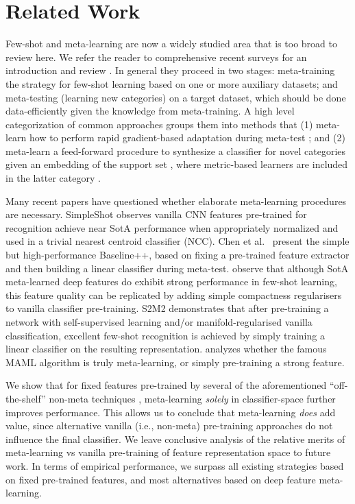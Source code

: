 \documentclass[10pt,twocolumn,letterpaper]{article}
\begin{document}
\section{Related Work}
Few-shot and meta-learning are now a widely studied area that is too broad to review here. We refer the reader to comprehensive recent surveys for an introduction and review \cite{wang2019fewShotSurvey,hospedales2020metaSurvey}. In general they proceed in two stages: meta-training the strategy for few-shot learning based on one or more auxiliary datasets; and meta-testing (learning new categories) on a target dataset, which should be done data-efficiently given the knowledge from meta-training.
A high level categorization of common approaches groups them into methods that (1) meta-learn how to perform rapid gradient-based adaptation during meta-test \cite{finn2017model,zintgraf2018cavia}; and (2) meta-learn a feed-forward procedure to synthesize a classifier for novel categories given an embedding of the support set \cite{gordon2019metaPred,qiao2017few}, where metric-based learners are included in the latter category \cite{hospedales2020metaSurvey}. 

 Many recent papers have questioned whether elaborate meta-learning procedures are necessary. 
SimpleShot \cite{wang2019simpleshot} observes vanilla CNN features pre-trained for recognition achieve near SotA performance when appropriately normalized and used in a trivial nearest centroid classifier (NCC). Chen et al.~\cite{chen2019closerfewshot} present the simple but high-performance Baseline++, based on fixing a pre-trained feature extractor and then building a linear classifier during meta-test.
\cite{goldblum2020unraveling} observe that although SotA meta-learned deep features do exhibit strong performance in few-shot learning, this feature quality can be replicated by adding simple compactness regularisers to vanilla classifier pre-training. S2M2 \cite{mangla2020charting} demonstrates that after pre-training a network with self-supervised learning and/or manifold-regularised vanilla classification, excellent few-shot recognition is achieved by simply training a linear classifier on the resulting representation. \cite{yin2020metaMemorisation} analyzes whether the famous MAML algorithm is truly meta-learning, or simply pre-training a strong feature.

We show that for fixed features pre-trained by several of the aforementioned ``off-the-shelf'' non-meta techniques \cite{wang2019simpleshot,mangla2020charting}, meta-learning \emph{solely} in classifier-space further improves performance. This allows us to  conclude that meta-learning \emph{does} add value, since alternative vanilla (i.e., non-meta) pre-training approaches do not influence the final classifier. We leave conclusive analysis of the relative merits of meta-learning vs vanilla pre-training of feature representation space to future work. In terms of empirical performance, we surpass all existing strategies based on fixed pre-trained features, and most alternatives based on deep feature meta-learning.
\end{document}
